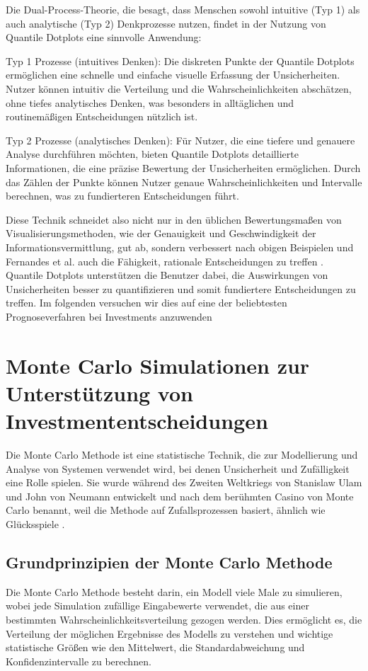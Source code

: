 Die Dual-Process-Theorie, die besagt, dass Menschen sowohl intuitive (Typ 1) als auch analytische (Typ 2) Denkprozesse nutzen, findet in der Nutzung von Quantile Dotplots eine sinnvolle Anwendung:

Typ 1 Prozesse (intuitives Denken): Die diskreten Punkte der Quantile Dotplots ermöglichen eine schnelle und einfache visuelle 
Erfassung der Unsicherheiten. Nutzer können intuitiv die Verteilung und die Wahrscheinlichkeiten abschätzen, ohne tiefes 
analytisches Denken, was besonders in alltäglichen und routinemäßigen Entscheidungen nützlich ist.

Typ 2 Prozesse (analytisches Denken): Für Nutzer, die eine tiefere und genauere Analyse durchführen möchten, 
bieten Quantile Dotplots detaillierte Informationen, die eine präzise Bewertung der Unsicherheiten ermöglichen. Durch das Zählen der 
Punkte können Nutzer genaue Wahrscheinlichkeiten und Intervalle berechnen, was zu fundierteren Entscheidungen führt.

Diese Technik schneidet also nicht nur in den üblichen Bewertungsmaßen von Visualisierungsmethoden, wie der Genauigkeit und 
Geschwindigkeit der Informationsvermittlung, gut ab, sondern verbessert nach obigen Beispielen und Fernandes et al. auch die Fähigkeit, 
rationale Entscheidungen zu treffen \cite{Fernandes2018}. Quantile Dotplots unterstützen die Benutzer dabei, die Auswirkungen 
von Unsicherheiten besser zu quantifizieren und somit fundiertere Entscheidungen zu treffen. Im folgenden versuchen wir dies auf 
eine der beliebtesten Prognoseverfahren bei Investments anzuwenden


\section{Monte Carlo Simulationen zur Unterstützung von Investmententscheidungen}

Die Monte Carlo Methode ist eine statistische Technik, die zur Modellierung und Analyse von Systemen verwendet wird, bei denen 
Unsicherheit und Zufälligkeit eine Rolle spielen. Sie wurde während des Zweiten Weltkriegs von Stanislaw Ulam und John von Neumann 
entwickelt und nach dem berühmten Casino von Monte Carlo benannt, weil die Methode auf Zufallsprozessen basiert, 
ähnlich wie Glücksspiele \cite{Walter2014}.


\subsection{Grundprinzipien der Monte Carlo Methode}
Die Monte Carlo Methode besteht darin, ein Modell viele Male zu simulieren, wobei jede Simulation zufällige Eingabewerte verwendet, 
die aus einer bestimmten Wahrscheinlichkeitsverteilung gezogen werden. Dies ermöglicht es, die Verteilung der möglichen Ergebnisse 
des Modells zu verstehen und wichtige statistische Größen wie den Mittelwert, die Standardabweichung und 
Konfidenzintervalle zu berechnen.

